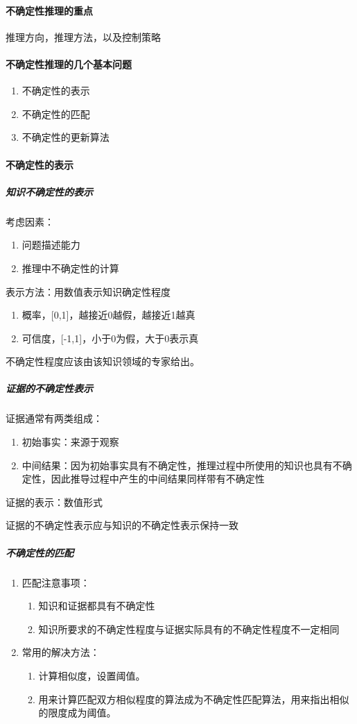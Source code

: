 \documentclass[12pt]{article}
\begin{document}
\paragraph{不确定性推理的重点}
推理方向，推理方法，以及控制策略
\paragraph{不确定性推理的几个基本问题}
\begin{enumerate}
  \item{不确定性的表示}
  \item{不确定性的匹配}
  \item{不确定性的更新算法}
\end{enumerate}
\paragraph{不确定性的表示}
\subparagraph{知识不确定性的表示}
考虑因素：\\
\begin{enumerate}
  \item{问题描述能力}
  \item{推理中不确定性的计算}
\end{enumerate}
表示方法：用数值表示知识确定性程度
\begin{enumerate}
  \item{概率，[0,1]，越接近0越假，越接近1越真}
  \item{可信度，[-1,1]，小于0为假，大于0表示真}
\end{enumerate}
不确定性程度应该由该知识领域的专家给出。
\subparagraph{证据的不确定性表示}
\begin{enumerate}
  \item{证据通常有两类组成：
    \begin{enumerate}
      \item{初始事实：来源于观察}
      \item{中间结果：因为初始事实具有不确定性，推理过程中所使用的知识也具有不确定性，因此推导过程中产生的中间结果同样带有不确定性}
    \end{enumerate}
  \item{证据的表示：数值形式}
  \item{证据的不确定性表示应与知识的不确定性表示保持一致}
  }
\end{enumerate}
\subparagraph{不确定性的匹配}
\begin{enumerate}
  \item{匹配注意事项：
    \begin{enumerate}
      \item{知识和证据都具有不确定性}
      \item{知识所要求的不确定性程度与证据实际具有的不确定性程度不一定相同}
    \end{enumerate}
  }
  \item{常用的解决方法：
    \begin{enumerate}
      \item{计算相似度，设置阈值。}
      \item{用来计算匹配双方相似程度的算法成为不确定性匹配算法，用来指出相似的限度成为阈值。}
    \end{enumerate}
  }
\end{enumerate}
\end{document}
